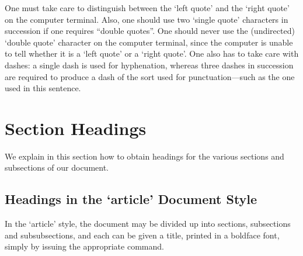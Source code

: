 \documentclass[a4paper,10pt]{article}
\begin{document}
One must take care to distinguish between the `left quote'
and the `right quote' on the computer terminal.  Also, one
should use two `single quote' characters in succession if
one requires ``double quotes''.  One should never use the
(undirected) `double quote' character on the computer
terminal, since the computer is unable to tell whether it
is a `left quote' or a `right quote'.  One also has to
take care with dashes: a single dash is used for
hyphenation, whereas three dashes in succession are required
to produce a dash of the sort used for punctuation---such as
the one used in this sentence.

\section{Section Headings}

We explain in this section how to obtain headings
for the various sections and subsections of our
document.

\subsection{Headings in the `article' Document Style}

In the `article' style, the document may be divided up
into sections, subsections and subsubsections, and each
can be given a title, printed in a boldface font,
simply by issuing the appropriate command.
\end{document}
